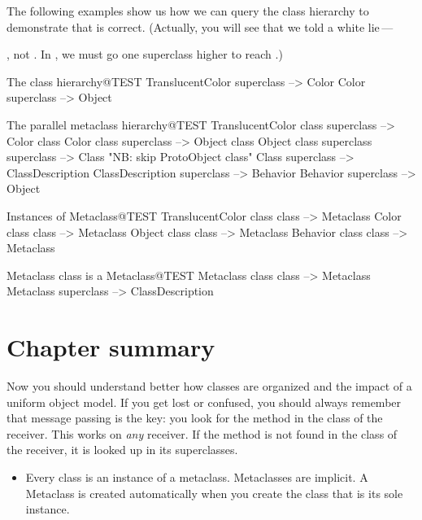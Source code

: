 \documentclass[a4paper,10pt,twoside]{book}
\begin{document}
The following examples show us how we can query the class hierarchy to demonstrate that  is correct.
(Actually, you will see that we told a white lie\,---\, {, not . In \sq, we must go one superclass higher to reach .)

\begin{example}{The class hierarchy}{@TEST}
TranslucentColor superclass --> Color
Color superclass                   --> Object
\end{example}

\begin{example}{The parallel metaclass hierarchy}{@TEST}
TranslucentColor class superclass   --> Color class
Color class superclass                     --> Object class
Object class superclass superclass --> Class    "NB: skip ProtoObject class"
Class superclass                              --> ClassDescription
ClassDescription superclass            --> Behavior
Behavior superclass                         --> Object
\end{example}

\begin{example}{Instances of Metaclass}{@TEST}
TranslucentColor class class --> Metaclass
Color class class                   --> Metaclass
Object class class                 --> Metaclass
Behavior class class              --> Metaclass
\end{example}
\begin{example}{Metaclass class is a Metaclass}{@TEST}
Metaclass class class --> Metaclass
Metaclass superclass --> ClassDescription
\end{example}

\section{Chapter summary}
Now you should understand better how classes are organized and the impact of a uniform object model. If you get lost or confused, you should always remember that message passing is the key: you look for the method in the class of the receiver. 
This works on \emph{any} receiver. 
If the method is not found in the class of the receiver, it is looked up in its superclasses.

\begin{itemize}
\item Every class is an instance of a metaclass.
	Metaclasses are implicit. A Metaclass is created automatically when you create the class that is its sole instance.


\end{itemize}}
\end{document}
